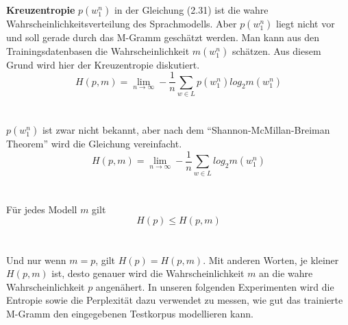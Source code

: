 \textbf{Kreuzentropie}
$p(w_{1}^{n})$ in der Gleichung (2.31) ist die wahre Wahrscheinlichkeitsverteilung des Sprachmodells. Aber $p(w_{1}^{n})$ liegt nicht vor und soll gerade durch das M-Gramm gesch\"atzt werden. Man kann aus den Trainingsdatenbasen die Wahrscheinlichkeit $m(w_{1}^{n})$ sch\"atzen. Aus diesem Grund  wird hier der Kreuzentropie diskutiert.
\begin{equation}
H(p,m)=\lim_{n\to\infty}-\frac{1}{n}\sum_{w\in L}p(w_{1}^{n})log_{2}m(w_{1}^{n})
\end{equation}
\\
\\
$p(w_{1}^{n})$ ist zwar nicht bekannt, aber nach dem "`Shannon-McMillan-Breiman Theorem"' wird die Gleichung vereinfacht. 
\begin{equation}
H(p,m)=\lim_{n\to\infty}-\frac{1}{n}\sum_{w\in L}log_{2}m(w_{1}^{n})
\end{equation}
\\
\\
F\"ur jedes Modell $m$ gilt \\
\begin{equation}
H(p)\leq H(p,m)
\end{equation}
\\
\\
Und nur wenn $m=p$, gilt $H(p)=H(p,m)$. Mit anderen Worten, je kleiner $H(p,m)$ ist, desto genauer wird die Wahrscheinlichkeit $m$ an die wahre Wahrscheinlichkeit $p$ angen\"ahert.
In unseren folgenden Experimenten wird die Entropie sowie die Perplexit\"at dazu verwendet zu messen, wie gut das trainierte M-Gramm den eingegebenen Testkorpus modellieren kann.

